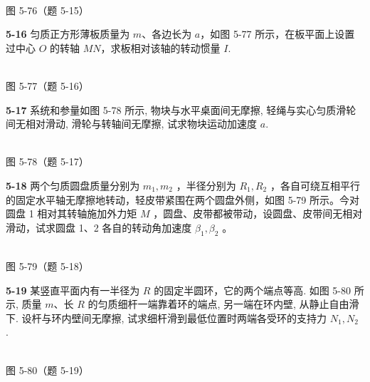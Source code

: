 \begin{center}
\resizebox{0.39\textwidth}{!}{}\\[4pt]
{\small 图 5-76（题 5-15）}
\end{center}

\newpage

\textbf{5-16} 匀质正方形薄板质量为 $m$、各边长为 $a$，如图 5-77 所示，在板平面上设置过中心 $O$ 的转轴 $MN$，求板相对该轴的转动惯量 $I$.

\begin{center}
\resizebox{0.32\textwidth}{!}{}\\[4pt]
{\small 图 5-77（题 5-16）}
\end{center}

\newpage

\textbf{5-17} 系统和参量如图 5-78 所示, 物块与水平桌面间无摩擦, 轻绳与实心匀质滑轮间无相对滑动, 滑轮与转轴间无摩擦, 试求物块运动加速度 $a$.

\begin{center}
\resizebox{0.40\textwidth}{!}{}\\[4pt]
{\small 图 5-78（题 5-17）}
\end{center}

\newpage

\textbf{5-18} 两个匀质圆盘质量分别为 $m_{1}, m_{2}$ ，半径分别为 $R_{1}, R_{2}$ ，各自可绕互相平行的固定水平轴无摩擦地转动，轻皮带紧围在两个圆盘外侧，如图 5-79 所示。今对圆盘 1 相对其转轴施加外力矩 $M$ ，圆盘、皮带都被带动，设圆盘、皮带间无相对滑动，试求圆盘 1、2 各自的转动角加速度 $\beta_{1}, \beta_{2}$ 。

\begin{center}
\resizebox{0.50\textwidth}{!}{}\\[4pt]
{\small 图 5-79（题 5-18）}
\end{center}

\newpage

\textbf{5-19} 某竖直平面内有一半径为 $R$ 的固定半圆环，它的两个端点等高. 如图 5-80 所示, 质量 $m$、长 $R$ 的匀质细杆一端靠着环的端点, 另一端在环内壁, 从静止自由滑下. 设杆与环内壁间无摩擦, 试求细杆滑到最低位置时两端各受环的支持力 $N_{1}, N_{2}$ .

\begin{center}
\resizebox{0.40\textwidth}{!}{}\\[4pt]
{\small 图 5-80（题 5-19）}
\end{center}

